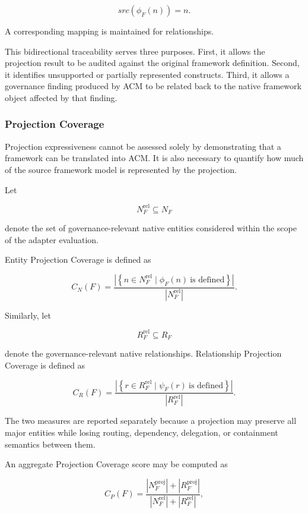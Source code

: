\documentclass[10pt]{article}
\begin{document}
\[
src(\phi_F(n))=n.
\tag{45}
\]

A corresponding mapping is maintained for relationships.

This bidirectional traceability serves three purposes. First, it allows the
projection result to be audited against the original framework definition.
Second, it identifies unsupported or partially represented constructs. Third,
it allows a governance finding produced by ACM to be related back to the native
framework object affected by that finding.

\subsubsection{Projection Coverage}

Projection expressiveness cannot be assessed solely by demonstrating that a
framework can be translated into ACM. It is also necessary to quantify how much
of the source framework model is represented by the projection.

Let

\[
N_F^{\mathrm{rel}}
\subseteq
N_F
\]

denote the set of governance-relevant native entities considered within the
scope of the adapter evaluation.

Entity Projection Coverage is defined as

\[
C_N(F)
=
\frac{
	\left|
	\left\{
	n\in N_F^{\mathrm{rel}}
	\mid
	\phi_F(n)\ \text{is defined}
	\right\}
	\right|
}{
	|N_F^{\mathrm{rel}}|
}.
\tag{46}
\]

Similarly, let

\[
R_F^{\mathrm{rel}}
\subseteq
R_F
\]

denote the governance-relevant native relationships. Relationship Projection
Coverage is defined as

\[
C_R(F)
=
\frac{
	\left|
	\left\{
	r\in R_F^{\mathrm{rel}}
	\mid
	\psi_F(r)\ \text{is defined}
	\right\}
	\right|
}{
	|R_F^{\mathrm{rel}}|
}.
\tag{47}
\]

The two measures are reported separately because a projection may preserve all
major entities while losing routing, dependency, delegation, or containment
semantics between them.

An aggregate Projection Coverage score may be computed as

\[
C_P(F)
=
\frac{
	|N_F^{\mathrm{proj}}|
	+
	|R_F^{\mathrm{proj}}|
}{
	|N_F^{\mathrm{rel}}|
	+
	|R_F^{\mathrm{rel}}|
},
\tag{48}
\]
\end{document}
